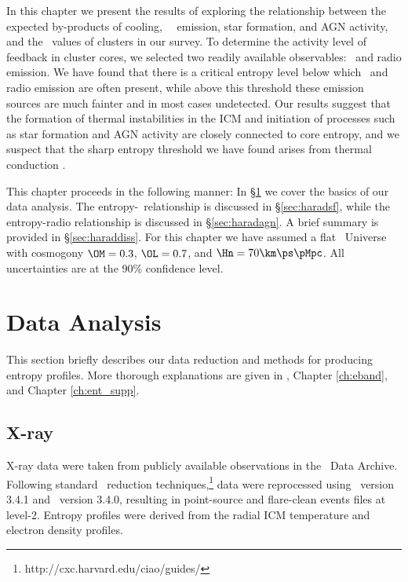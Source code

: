 In this chapter we present the results of exploring the relationship
between the expected by-products of cooling, \eg\ \halpha\ emission,
star formation, and AGN activity, and the \kna\ values of clusters in
our survey. To determine the activity level of feedback in cluster
cores, we selected two readily available observables: \halpha\ and
radio emission. We have found that there is a critical entropy level
below which \halpha\ and radio emission are often present, while above
this threshold these emission sources are much fainter and in most
cases undetected. Our results suggest that the formation of thermal
instabilities in the ICM and initiation of processes such as star
formation and AGN activity are closely connected to core entropy, and
we suspect that the sharp entropy threshold we have found arises from
thermal conduction \citep[see][for discussion of this
  point]{conduction}.

This chapter proceeds in the following manner: In
\S\ref{sec:haraddata} we cover the basics of our data analysis. The
entropy-\halpha\ relationship is discussed in \S\ref{sec:haradsf},
while the entropy-radio relationship is discussed in
\S\ref{sec:haradagn}. A brief summary is provided in
\S\ref{sec:haraddiss}. For this chapter we have assumed a flat
\LCDM\ Universe with cosmogony $\OM=0.3$, $\OL=0.7$, and
$\Hn=70\km\ps\pMpc$. All uncertainties are at the 90\% confidence
level.

\section{Data Analysis}
\label{sec:haraddata}

This section briefly describes our data reduction and methods for
producing entropy profiles. More thorough explanations are given in
\cite{d06}, Chapter \ref{ch:eband}, and Chapter \ref{ch:ent_supp}.

\subsection{X-ray}
\label{sec:haradxray}

X-ray data were taken from publicly available observations in the
\chandra\ Data Archive. Following standard \ciao\ reduction
techniques,\footnote{http://cxc.harvard.edu/ciao/guides/} data were
reprocessed using \ciao\ version 3.4.1 and \caldb\ version 3.4.0,
resulting in point-source and flare-clean events files at
level-2. Entropy profiles were derived from the radial ICM temperature
and electron density profiles.

